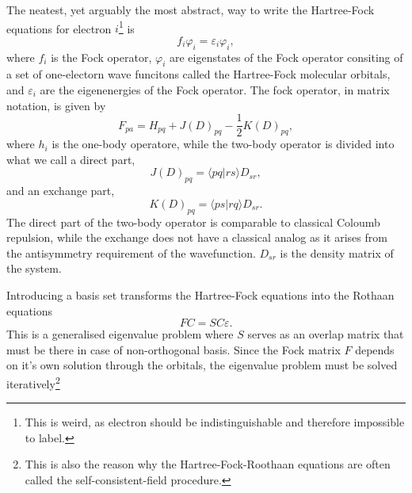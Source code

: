 \documentclass[
    a4paper, aps, twocolumn, floatfix, superscriptaddress,
    nofootinbib]{revtex4-1}
\newcommand{\1}{\mathds{1}}
\newcommand{\braket}[2]{\langle #1 \vert #2 \rangle}
\begin{document}
            The neatest, yet arguably the most abstract, way to write the Hartree-Fock
            equations for electron $i$\footnote{This is weird, as electron
            should be indistinguishable and therefore impossible to label.} is
            \begin{equation}
                f_i \varphi_i = \varepsilon_i \varphi_i,
            \end{equation}
            where $f_i$ is the Fock operator, $\varphi_i$ are eigenstates of the Fock
            operator consiting of a set of one-electorn wave funcitons called the
            Hartree-Fock molecular orbitals, and $\varepsilon_i$ are the eigenenergies
            of the Fock operator. The fock operator, in matrix notation, is given by
            \begin{equation}
                F_{pa} = H_{pq} +  J(D)_{pq} - \frac{1}{2}K(D)_{pq},
            \end{equation}
            where $h_i$ is the one-body operatore, while the two-body operator is
            divided into what we call a direct part,
            \begin{equation}
                J(D)_{pq} = \braket{pq}{rs}D_{sr},
            \end{equation}
            and an exchange part,
            \begin{equation}
                K(D)_{pq} = \braket{ps}{rq}D_{sr}.
            \end{equation}
            The direct part of the two-body operator is comparable to classical Coloumb
            repulsion, while the exchange does not have a classical analog as it arises
            from the antisymmetry requirement of the wavefunction. $D_{sr}$ is the
            density matrix of the system.

            Introducing a basis set transforms the Hartree-Fock equations into the Rothaan
            equations
            \begin{equation}
                FC = SC\varepsilon.
            \end{equation}
            This is a generalised eigenvalue problem where $S$ serves as an overlap matrix
            that must be there in case of non-orthogonal basis. Since the Fock matrix $F$
            depends on it's own solution through the orbitals, the eigenvalue problem must
            be solved iteratively\footnote{This is also the reason why the
            Hartree-Fock-Roothaan equations are often called the self-consistent-field
            procedure.}
\end{document}
